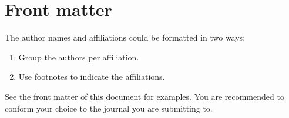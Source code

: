 \documentclass[5p]{elsarticle}
\begin{document}
\section{Front matter}

The author names and affiliations could be formatted in two ways:
\begin{enumerate}[(1)]
\item Group the authors per affiliation.
\item Use footnotes to indicate the affiliations.
\end{enumerate}
See the front matter of this document for examples. You are recommended to conform your choice to the journal you are submitting to.
\end{document}

